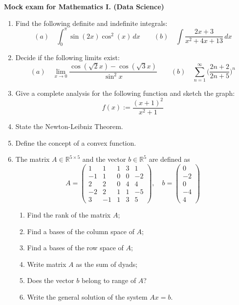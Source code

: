 \documentclass{report}
\begin{document}
\begin{center}
{\Large\textbf{Mock exam for Mathematics I. (Data Science)}} \\
\vspace{0.3cm} 
\end{center}

\begin{enumerate}


\item Find the following definite and indefinite integrals:
\[(a) \quad \int_0^{\pi} \sin(2x)\cos^{2}(x)\,dx\qquad (b) \quad \int \frac{2x+3}{x^2+4x+13}\,dx\]
\item Decide if the following limits exist:
\[(a)\quad \lim_{x\to 0} \frac{\cos (\sqrt2 x)-\cos(\sqrt 3 x)}{\sin^2 x}\qquad (b)\quad \sum_{n=1}^\infty \Big(\frac{2n+2}{2n+5}\Big)^n\]
\item Give a complete analysis for the following function  and sketch the graph:
\[f(x):=\frac{(x+1)^2}{x^2+1}\]
\item State the Newton-Leibniz Theorem.
\item Define the concept of a convex function.
\item
The matrix $A\in\mathbb{R}^{5\times 5}$ and the vector $b\in\mathbb{R}^5$ are defined as
\[
    A=
    \begin{pmatrix}
        1&1&1&3&1\\
        -1&1&0&0&-2\\
        2&2&0&4&4\\
        -2&2&1&1&-5\\
        3&-1&1&3&5
    \end{pmatrix},
    \quad
    b=
    \begin{pmatrix}
        0\\-2\\0\\-4\\4
    \end{pmatrix}
\]
\begin{enumerate}
    \item Find the rank of the matrix $A$;
    \item Find a bases of the column space of $A$;
    \item Find a bases of the row space of $A$;
    \item Write matrix $A$ as the sum of dyads;
    \item Does the vector $b$ belong to range of $A$?
    \item Write the general solution of the system $Ax=b$.

\end{enumerate}
\end{enumerate}
\end{document}
